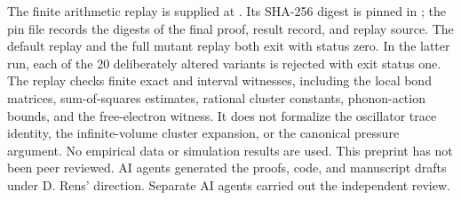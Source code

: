 \documentclass[11pt]{article}
\begin{document}
The finite arithmetic replay is supplied at . Its SHA-256 digest is pinned in ; the pin file records the digests of the final proof, result record, and replay source. The default replay and the full mutant replay both exit with status zero. In the latter run, each of the 20 deliberately altered variants is rejected with exit status one. The replay checks finite exact and interval witnesses, including the local bond matrices, sum-of-squares estimates, rational cluster constants, phonon-action bounds, and the free-electron witness. It does not formalize the oscillator trace identity, the infinite-volume cluster expansion, or the canonical pressure argument. No empirical data or simulation results are used. This preprint has not been peer reviewed. AI agents generated the proofs, code, and manuscript drafts under D. Rens' direction. Separate AI agents carried out the independent review.

{\raggedright\small\par}
\end{document}
